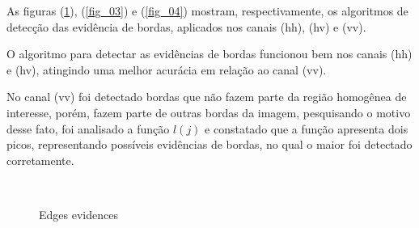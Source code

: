 \documentclass[conference]{IEEEtran}
\begin{document}
As figuras (\ref{fig_02}), (\ref{fig_03}) e (\ref{fig_04}) mostram, respectivamente, os algoritmos de detecção das evidência de bordas, aplicados nos canais (hh), (hv) e (vv). 

O algoritmo para detectar as evidências de bordas funcionou bem nos canais (hh) e (hv), atingindo uma melhor acurácia em relação ao canal (vv).  

No canal (vv) foi detectado bordas que não fazem parte da região homogênea de interesse, porém, fazem parte de outras bordas da imagem, pesquisando o motivo desse fato, foi analisado a função $l(j)$ e constatado que a função apresenta dois picos, representando possíveis evidências de bordas, no qual o maior foi detectado corretamente. 
 \begin{figure}[!ht]
     \hfill
     \\
     \centering
     \caption{Edges evidences}
     \label{fig_02}
   \end{figure}
\end{document}
